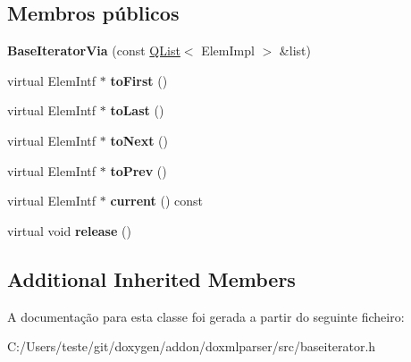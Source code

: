 \subsection*{Membros públicos}
\begin{DoxyCompactItemize}
\item 
\hypertarget{class_base_iterator_via_abd4ff79a5d17da775065887248d9c720}{{\bfseries Base\-Iterator\-Via} (const \hyperlink{class_q_list}{Q\-List}$<$ Elem\-Impl $>$ \&list)}\label{class_base_iterator_via_abd4ff79a5d17da775065887248d9c720}

\item 
\hypertarget{class_base_iterator_via_abf229c0e1893f20877b578ac2c7e5159}{virtual Elem\-Intf $\ast$ {\bfseries to\-First} ()}\label{class_base_iterator_via_abf229c0e1893f20877b578ac2c7e5159}

\item 
\hypertarget{class_base_iterator_via_a48309b7fc55a5c4d1b108327ead3a727}{virtual Elem\-Intf $\ast$ {\bfseries to\-Last} ()}\label{class_base_iterator_via_a48309b7fc55a5c4d1b108327ead3a727}

\item 
\hypertarget{class_base_iterator_via_a7d8f0436378f74c321dedf57fb8dab4f}{virtual Elem\-Intf $\ast$ {\bfseries to\-Next} ()}\label{class_base_iterator_via_a7d8f0436378f74c321dedf57fb8dab4f}

\item 
\hypertarget{class_base_iterator_via_a4da1240445f01ecc893d9b579be90b57}{virtual Elem\-Intf $\ast$ {\bfseries to\-Prev} ()}\label{class_base_iterator_via_a4da1240445f01ecc893d9b579be90b57}

\item 
\hypertarget{class_base_iterator_via_a1e22b4c1f1bcd62f8d167baf6fde83cb}{virtual Elem\-Intf $\ast$ {\bfseries current} () const }\label{class_base_iterator_via_a1e22b4c1f1bcd62f8d167baf6fde83cb}

\item 
\hypertarget{class_base_iterator_via_af8a84115de3507728d5e19e804529052}{virtual void {\bfseries release} ()}\label{class_base_iterator_via_af8a84115de3507728d5e19e804529052}

\end{DoxyCompactItemize}
\subsection*{Additional Inherited Members}


A documentação para esta classe foi gerada a partir do seguinte ficheiro\-:\begin{DoxyCompactItemize}
\item 
C\-:/\-Users/teste/git/doxygen/addon/doxmlparser/src/baseiterator.\-h\end{DoxyCompactItemize}

